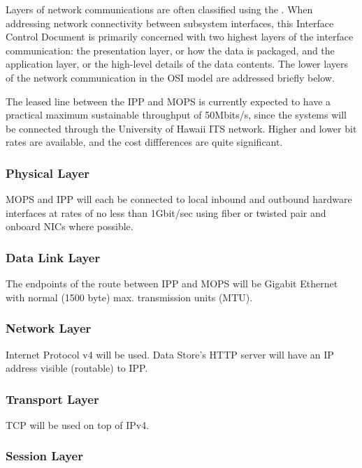 \documentclass[panstarrs,spec]{panstarrs}
\begin{document}
Layers of network communications are often classified using the
.  When addressing
network connectivity between subsystem interfaces, this
Interface Control Document is primarily concerned with two highest
layers of the interface communication: the presentation layer, or how
the data is packaged, and the application layer, or the high-level details of the
data contents.  The lower layers of the network communication in the OSI model
are addressed briefly below.

The leased line between the IPP and MOPS is currently expected to have a practical
maximum sustainable throughput of 50Mbits/s, since the systems will be connected
through the University of Hawaii ITS network.  Higher and lower bit rates are available,
and the cost diffferences are quite significant.

\subsubsection{Physical Layer}

MOPS and IPP will each be connected to local inbound and outbound hardware
interfaces at rates of no less than 1Gbit/sec using fiber or twisted pair
and onboard NICs where possible.

\subsubsection{Data Link Layer}

The endpoints of the route between IPP and MOPS will be Gigabit
Ethernet with normal (1500 byte) max. transmission units (MTU).

\subsubsection{Network Layer}

Internet Protocol v4 will be used.  Data Store's HTTP
server will have an IP address visible (routable) to IPP.

\subsubsection{Transport Layer}

TCP will be used on top of IPv4.

\subsubsection{Session Layer}
\end{document}
